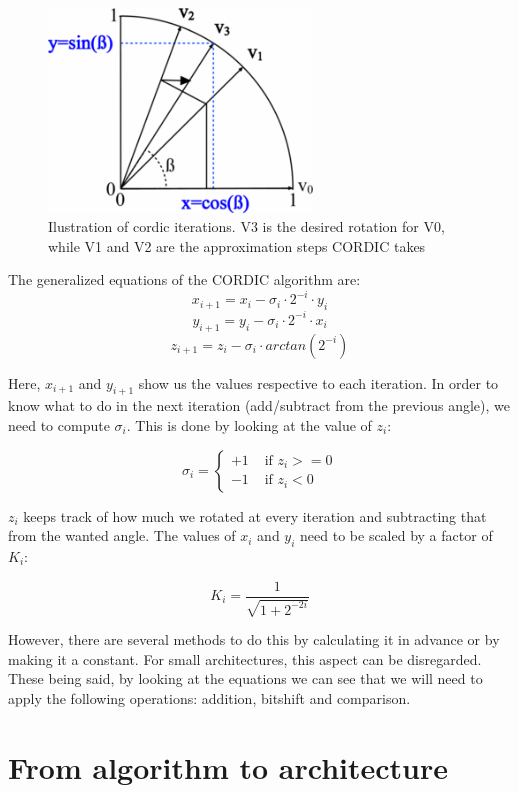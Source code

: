 \documentclass[12pt, a4paper,oneside]{article}
\begin{document}
\begin{figure}[h]
	\centering
	\includegraphics[width = 7cm]{cordic_iterations.png}
	\caption{Ilustration of cordic iterations. V3 is the desired rotation for V0,
	while V1 and V2 are the approximation steps CORDIC takes}
	\label{fig:cordic_iterations}
\end{figure}

The generalized equations of the CORDIC algorithm are:
\[ x_{i+1} = x_i - \sigma_i \cdot 2^{-i} \cdot y_i \]
\[ y_{i+1} = y_i - \sigma_i \cdot 2^{-i} \cdot x_i \]
\[ z_{i+1} = z_i - \sigma_i \cdot arctan(2^{-i}) \]


Here, $x_{i+1}$ and $y_{i+1}$ show us the values respective to each iteration.
In order to know what to do in the next iteration (add/subtract from the previous
angle), we need to compute $\sigma_i$. This is done by looking at the value of 
$z_i$:

$$
\sigma_i = \left\{ \begin{array}{rl}
 +1 &\mbox{ if $z_i>=0$} \\
 -1 &\mbox{ if $z_i<0$}
       \end{array} \right.
$$

$z_i$ keeps track of how much we rotated at every iteration and subtracting that 
from the wanted angle.
The values of $x_i$ and $y_i$ need to be scaled by a factor of $K_i$:

$$K_i = \frac{1}{\sqrt{1 + 2^{-2i}}}$$

However, there are several methods to do this by calculating it in advance or by 
making it a constant. For small architectures, this aspect can be disregarded.
\\
These being said, by looking at the equations we can see that we will need 
to apply the following operations: addition, bitshift and comparison.

\section{From algorithm to architecture}
\end{document}

